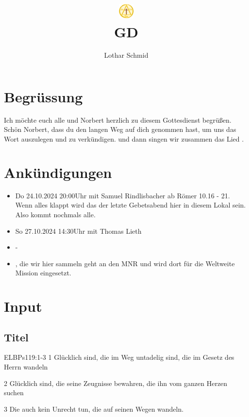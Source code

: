 \documentclass{../../inc/mybib}
\title{\includegraphics[height=23pt]{../../assets/images/logo.png}\\GD}
\author{Lothar Schmid}
\begin{document}
\maketitle
\section{Begrüssung}

Ich möchte euch alle und Norbert herzlich zu diesem Gottesdienst begrüßen.
Schön Norbert, dass du den langen Weg auf dich genommen hast, um uns das Wort auszulegen und zu verkündigen. 
\beten{} und dann singen wir zusammen das Lied .

\section{Ankündigungen}
\begin{itemize}
    \item {} Do 24.10.2024 20:00Uhr mit Samuel Rindlisbacher ab Römer 10.16 - 21. Wenn alles klappt wird das der letzte Gebetsabend hier in diesem Lokal sein. Also kommt nochmals alle.
    \item {} So 27.10.2024 14:30Uhr mit Thomas Lieth
    \item {} -
    \item {}, die wir hier sammeln geht an den MNR und wird dort für die Weltweite Mission eingesetzt.    
\end{itemize}

\section{ Input }
\begin{spacing}{1.5}
\subsection{Titel}
\begin{bibelbox}{ELB}{Ps}{119:1-3}
1 Glücklich sind, die im Weg untadelig sind, die im Gesetz des Herrn wandeln

2 Glücklich sind, die seine Zeugnisse bewahren, die ihn vom ganzen Herzen suchen

3 Die auch kein Unrecht tun, die auf seinen Wegen wandeln.

\end{bibelbox}

\end{spacing}
\end{document}
